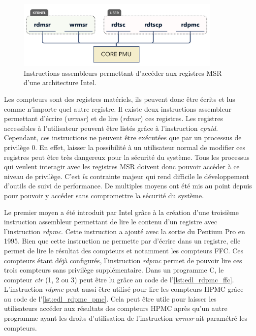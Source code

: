         \begin{figure}[h!]
            \center
            \includegraphics[width=10cm]{images/edl_perf_assembly_msr.png}
            \caption{\label{fig:edl_perf_assembly_msr} Instructions assembleurs permettant d'accéder aux registres MSR d'une architecture Intel.}
        \end{figure}
    
    
        Les compteurs sont des registres matériels, ils peuvent donc être écrits et lus comme n'importe quel autre registre. Il existe deux instructions assembleur permettant d'écrire (\textit{wrmsr}) et de lire (\textit{rdmsr}) ces registres. Les registres accessibles à l'utilisateur peuvent être listés grâce à l'instruction \textit{cpuid}. Cependant, ces instructions ne peuvent être exécutées que par un processus de privilège 0. En effet, laisser la possibilité à un utilisateur normal de modifier ces registres peut être très dangereux pour la sécurité du système. Tous les processus qui veulent interagir avec les registres MSR doivent donc pouvoir accéder à ce niveau de privilège. C'est \textit{la} contrainte majeur qui rend difficile le développement d'outils de suivi de performance. De multiples moyens ont été mis au point depuis pour pouvoir y accéder sans compromettre la sécurité du système. 
        
        Le premier moyen a été introduit par Intel grâce à la création d'une troisième instruction assembleur permettant de lire le contenu d'un registre avec l'instruction \textit{rdpmc}. Cette instruction a ajouté avec la sortie du Pentium Pro en 1995. Bien que cette instruction ne permette par d'écrire dans un registre, elle permet de lire le résultat des compteurs et notamment les compteurs FFC. Ces compteurs étant déjà configurés, l'instruction \textit{rdpmc} permet de pouvoir lire ces trois compteurs sans privilège supplémentaire. Dans un programme C, le compteur \textit{ctr} (1, 2 ou 3) peut être lu grâce au code de l'\autoref{lst:edl_rdpmc_ffc}. L'instruction \textit{rdpmc} peut aussi être utilisé pour lire les compteurs HPMC grâce au code de l'\autoref{lst:edl_rdpmc_pmc}. Cela peut être utile pour laisser les utilisateurs accéder aux résultats des compteurs HPMC après qu'un autre programme ayant les droits d'utilisation de l'instruction \textit{wrmsr} ait paramétré les compteurs.
    
